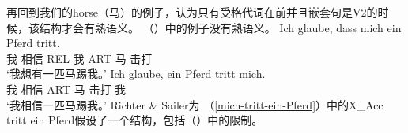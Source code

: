 再回到我们的horse（马）的例子，\citet[]{RS2009a}认为只有受格代词在前并且嵌套句是V2的时候，该结构才会有熟语义。 （）中的例子没有熟语义。
\eal
\ex 
\gll Ich glaube, dass mich ein Pferd tritt.\\
     我 相信   REL 我   ART 马   击打\\
\glt `我想有一匹马踢我。'
\ex 
\gll Ich glaube, ein Pferd tritt mich.\\
    我 相信   ART 马   击打 我\\
\glt `我相信一匹马踢我。'
\zl
Richter \& Sailer为 （\ref{mich-tritt-ein-Pferd}）中的X\_Acc tritt ein Pferd假设了一个结构，包括（）中的限制。

